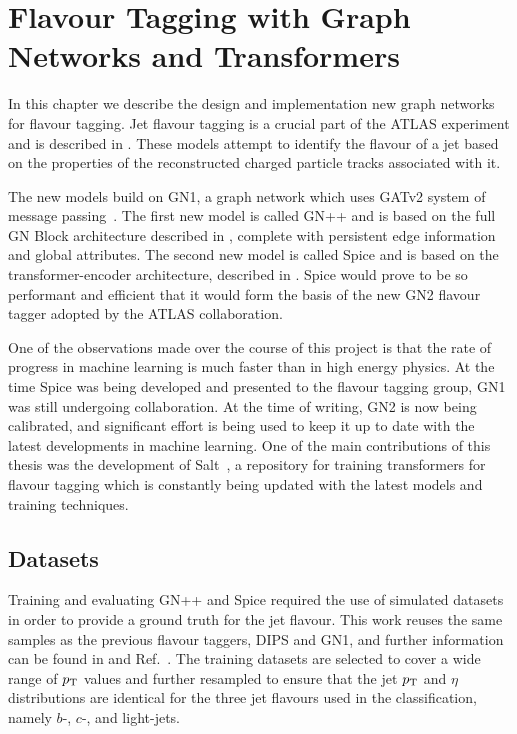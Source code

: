 
\chapter{Flavour Tagging with Graph Networks and Transformers}
\label{ch:spice}

In this chapter we describe the design and implementation new graph networks for flavour tagging.
Jet flavour tagging is a crucial part of the ATLAS experiment and is described in .
These models attempt to identify the flavour of a jet based on the properties of the reconstructed charged particle tracks associated with it.

The new models build on GN1, a graph network which uses GATv2 system of message passing~\cite{GATv2}.
The first new model is called GN++ and is based on the full GN Block architecture described in , complete with persistent edge information and global attributes.
The second new model is called Spice and is based on the transformer-encoder architecture, described in .
Spice would prove to be so performant and efficient that it would form the basis of the new GN2 flavour tagger adopted by the ATLAS collaboration.

One of the observations made over the course of this project is that the rate of progress in machine learning is much faster than in high energy physics.
At the time Spice was being developed and presented to the flavour tagging group, GN1 was still undergoing collaboration.
At the time of writing, GN2 is now being calibrated, and significant effort is being used to keep it up to date with the latest developments in machine learning.
One of the main contributions of this thesis was the development of Salt~\cite{Salt}, a repository for training transformers for flavour tagging which is constantly being updated with the latest models and training techniques.

\section{Datasets}

Training and evaluating GN++ and Spice required the use of simulated datasets in order to provide a ground truth for the jet flavour.
This work reuses the same samples as the previous flavour taggers, DIPS and GN1, and further information can be found in \textcite{AlexThesis} and Ref.~\cite{GN1}.
The training datasets are selected to cover a wide range of $p_{\text{T}}$ values and further resampled to ensure that the jet $p_{\text{T}}$ and $\eta$ distributions are identical for the three jet flavours used in the classification, namely $b$-, $c$-, and light-jets.

